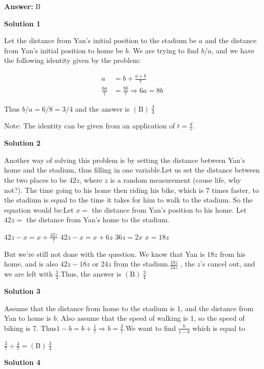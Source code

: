 \begin{enumerate}
 \textbf{Answer: }B



\textbf{Solution 1}

Let the distance from Yan's initial position to the stadium be $a$ and the distance from Yan's initial position to home be $b$. We are trying to find $b/a$, and we have the following identity given by the problem:

 
 \begin{align*}a &= b + \frac{a+b}{7}\\ \frac{6a}{7} &= \frac{8b}{7} \Longrightarrow 6a = 8b\end{align*}


 Thus $b/a = 6/8 = 3/4$ and the answer is $\mathrm{(B)}\ \frac{3}{4}$

 Note: The identity can be given from an application of $t=\frac dr$.

 



\textbf{Solution 2}

Another way of solving this problem is by setting the distance between Yan's home and the stadium, thus filling in one variable.Let us set the distance between the two places to be $42z$, where $z$ is a random measurement (cause life, why not?). The time going to his home then riding his bike, which is $7$ times faster, to the stadium is equal to the time it takes for him to walk to the stadium. So the equation would be:Let $x=$ the distance from Yan's position to his home. Let $42z=$ the distance from Yan's home to the stadium.

 $42z-x=x+\frac{42z}{7}$
$42z-x=x+6z$
$36z=2x$
$x=18z$

 But we're still not done with the question. We know that Yan is $18z$ from his home, and is also $42z-18z$ or $24z$ from the stadium.$\frac{18z}{24z}$  , the $z$'s cancel out, and we are left with $\frac{3}{4}$.Thus, the answer is $\mathrm{(B)}\ \frac{3}{4}$




\textbf{Solution 3}

Assume that the distance from home to the stadium is 1, and the distance from Yan to home is $b$. Also assume that the speed of walking is 1, so the speed of biking is 7. Thus$1-b=b+\frac{1}{7} \Longrightarrow b=\frac{3}{7}$.We want to find $\frac{b}{1-b}$ which is equal to

 $\frac{3}{7} \div \frac{4}{7} = \mathrm{(B)}\ \frac{3}{4}$




\textbf{Solution 4}



\end{enumerate}
